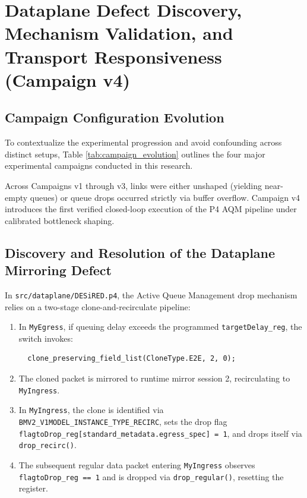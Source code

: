 \documentclass[12pt,a4paper,oneside]{report}
\begin{document}
\section{Dataplane Defect Discovery, Mechanism Validation, and Transport Responsiveness (Campaign v4)}
\label{sec:campaign_v4_mechanism}

\subsection{Campaign Configuration Evolution}
To contextualize the experimental progression and avoid confounding across distinct setups, Table \ref{tab:campaign_evolution} outlines the four major experimental campaigns conducted in this research.



Across Campaigns v1 through v3, links were either unshaped (yielding near-empty queues) or queue drops occurred strictly via buffer overflow. Campaign v4 introduces the first verified closed-loop execution of the P4 AQM pipeline under calibrated bottleneck shaping.

\subsection{Discovery and Resolution of the Dataplane Mirroring Defect}
In \texttt{src/dataplane/DESiRED.p4}, the Active Queue Management drop mechanism relies on a two-stage clone-and-recirculate pipeline:
\begin{enumerate}[label=\arabic*.]
  \item In \texttt{MyEgress}, if queuing delay exceeds the programmed \texttt{targetDelay\_reg}, the switch invokes:
  \begin{verbatim}
  clone_preserving_field_list(CloneType.E2E, 2, 0);
  \end{verbatim}
  \item The cloned packet is mirrored to runtime mirror session 2, recirculating to \texttt{MyIngress}.
  \item In \texttt{MyIngress}, the clone is identified via \texttt{BMV2\_V1MODEL\_INSTANCE\_TYPE\_RECIRC}, sets the drop flag \texttt{flagtoDrop\_reg[standard\_metadata.egress\_spec] = 1}, and drops itself via \texttt{drop\_recirc()}.
  \item The subsequent regular data packet entering \texttt{MyIngress} observes \texttt{flagtoDrop\_reg == 1} and is dropped via \texttt{drop\_regular()}, resetting the register.
\end{enumerate}
\end{document}
